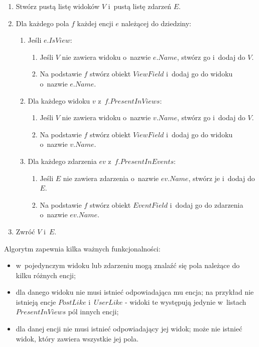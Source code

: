 \begin{enumerate}
 \item Stwórz pustą listę widoków $V$ i~pustą listę zdarzeń $E$.
 \item Dla każdego pola $f$ każdej encji $e$ należącej do dziedziny:
  \begin{enumerate}
   \item Jeśli $e.IsView$:
    \begin{enumerate}
     \item Jeśli $V$ nie zawiera widoku o~nazwie $e.Name$, stwórz go i~dodaj do $V$.
     \item Na podstawie $f$ stwórz obiekt $ViewField$ i~dodaj go do widoku o~nazwie $e.Name$.
    \end{enumerate}
   \item Dla każdego widoku $v$ z~$f.PresentInViews$:
    \begin{enumerate}
     \item Jeśli $V$ nie zawiera widoku o~nazwie $v.Name$, stwórz go i~dodaj do $V$.
     \item Na podstawie $f$ stwórz obiekt $ViewField$ i~dodaj go do widoku o~nazwie $v.Name$.
    \end{enumerate}
   \item Dla każdego zdarzenia $ev$ z~$f.PresentInEvents$:
    \begin{enumerate}
     \item Jeśli $E$ nie zawiera zdarzenia o~nazwie $ev.Name$, stwórz je i~dodaj do $E$.
     \item Na podstawie $f$ stwórz obiekt $EventField$ i~dodaj go do zdarzenia o~nazwie $ev.Name$.
    \end{enumerate}
  \end{enumerate}
 \item Zwróć $V$ i~$E$.
\end{enumerate}

Algorytm zapewnia kilka ważnych funkcjonalności:

\begin{itemize}
 \item w~pojedynczym widoku lub zdarzeniu mogą znalaźć się pola należące do kilku różnych encji;
 \item dla danego widoku nie musi istnieć odpowiadająca mu encja; na przykład nie istnieją encje $PostLike$ i~$UserLike$ - widoki te występują jedynie w~listach $PresentInViews$ pól innych encji;
 \item dla danej encji nie musi istnieć odpowiadający jej widok; może nie istnieć widok, który zawiera wszystkie jej pola.
\end{itemize}



